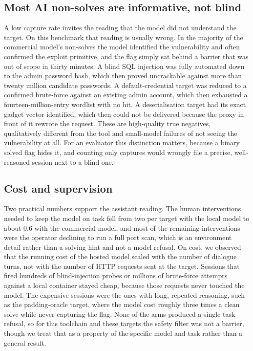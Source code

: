 \documentclass[11pt]{article}
\begin{document}
\subsection{Most AI non-solves are informative, not blind}
A low capture rate invites the reading that the model did not understand the target. On this benchmark that reading is usually wrong. In the majority of the commercial model's non-solves the model identified the vulnerability and often confirmed the exploit primitive, and the flag simply sat behind a barrier that was out of scope in thirty minutes. A blind SQL injection was fully automated down to the admin password hash, which then proved uncrackable against more than twenty million candidate passwords. A default-credential target was reduced to a confirmed brute-force against an existing admin account, which then exhausted a fourteen-million-entry wordlist with no hit. A deserialisation target had its exact gadget vector identified, which then could not be delivered because the proxy in front of it rewrote the request. These are high-quality true negatives, qualitatively different from the tool and small-model failures of not seeing the vulnerability at all. For an evaluator this distinction matters, because a binary solved flag hides it, and counting only captures would wrongly file a precise, well-reasoned session next to a blind one.

\subsection{Cost and supervision}
Two practical numbers support the assistant reading. The human interventions needed to keep the model on task fell from two per target with the local model to about 0.6 with the commercial model, and most of the remaining interventions were the operator declining to run a full port scan, which is an environment detail rather than a solving hint and not a model refusal. On cost, we observed that the running cost of the hosted model scaled with the number of dialogue turns, not with the number of HTTP requests sent at the target. Sessions that fired hundreds of blind-injection probes or millions of brute-force attempts against a local container stayed cheap, because those requests never touched the model. The expensive sessions were the ones with long, repeated reasoning, such as the padding-oracle target, where the model cost roughly three times a clean solve while never capturing the flag. None of the arms produced a single task refusal, so for this toolchain and these targets the safety filter was not a barrier, though we treat that as a property of the specific model and task rather than a general result.
\end{document}
